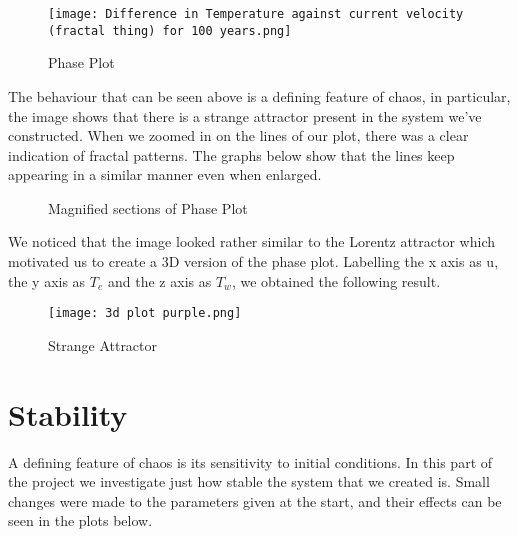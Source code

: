\documentclass{article}
\begin{document}
\begin{figure}[h]
\centering
\texttt{[image: Difference in Temperature against current velocity (fractal thing) for 100 years.png]}
\caption{\label{fig:Diagram}Phase Plot}
\end{figure}

The behaviour that can be seen above is a defining feature of chaos, in particular, the image shows that there is a strange attractor present in the system we’ve constructed. When we zoomed in on the lines of our plot, there was a clear indication of fractal patterns. The graphs below show that the lines keep appearing in a similar manner even when enlarged.

\begin{figure}[h]
    \centering
    \qquad
    \label{fig:example}%

    \centering
    \caption{Magnified sections of Phase Plot}%
    \label{fig:example}%
\end{figure}

\newpage

We noticed that the image looked rather similar to the Lorentz attractor which motivated us to create a 3D version of the phase plot. Labelling the x axis as u, the y axis as $T_e$ and the z axis as $T_w$, we obtained the following result.

\begin{figure}[h]
\centering
\texttt{[image: 3d plot purple.png]}
\caption{\label{fig:Diagram}Strange Attractor}
\end{figure}

\section{Stability}

A defining feature of chaos is its sensitivity to initial conditions. In this part of the project we investigate just how stable the system that we created is. Small changes were made to the parameters given at the start, and their effects can be seen in the plots below.
\end{document}
